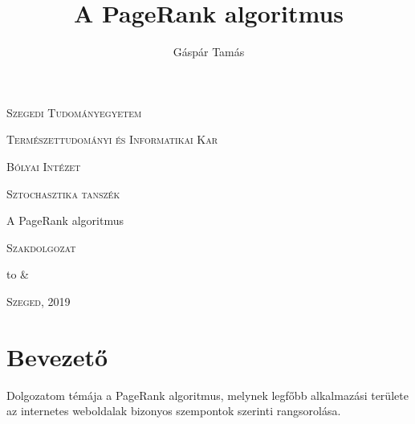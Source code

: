 \documentclass[12pt,a4paper]{article}
\author{Gáspár Tamás}
\title{A PageRank algoritmus}
\date{}
\begin{document}

\thispagestyle{empty}
\centerline{\textsc{\Large{Szegedi Tudományegyetem}}}
\vspace{0.3 cm}
\centerline{\textsc{\Large{Természettudományi és Informatikai Kar}}}

\vspace*{2 cm}

\centerline{\textsc{\Large{Bólyai Intézet}}}
\vspace{0.3 cm}
\centerline{\textsc{\Large{Sztochasztika tanszék}}}

\vspace{3 cm}

\centerline{\LARGE{A PageRank algoritmus}}
\vspace{0.5 cm}
\centerline{\Large{\textsc{Szakdolgozat}}}

\vspace{3 cm}

\begin{center}
	\begin{tabu} to \textwidth { X[l]  X[r] }
		 &
		  \\
	\end{tabu}
\end{center}

\vspace{3 cm}

\centerline{\Large{\textsc{Szeged, 2019}}}

\newpage
\thispagestyle{empty}

\tableofcontents

\newpage
\setcounter{page}{1}
\fontsize{12}{16}\selectfont

\section{Bevezető}

Dolgozatom témája a PageRank algoritmus, melynek legfőbb alkalmazási területe az internetes weboldalak bizonyos szempontok szerinti rangsorolása.
\end{document}
